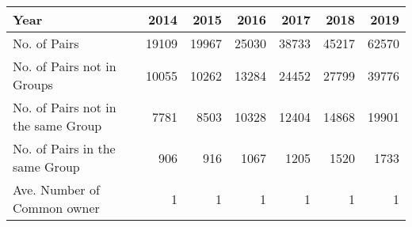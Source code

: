 \begin{tabular}{lrrrrrr}
\toprule
Year &   2014 &   2015 &   2016 &   2017 &   2018 &   2019 \\
\midrule
No. of Pairs                       &  19109 &  19967 &  25030 &  38733 &  45217 &  62570 \\
No. of Pairs not in Groups         &  10055 &  10262 &  13284 &  24452 &  27799 &  39776 \\
No. of Pairs not in the same Group &   7781 &   8503 &  10328 &  12404 &  14868 &  19901 \\
No. of Pairs in the same Group     &    906 &    916 &   1067 &   1205 &   1520 &   1733 \\
Ave. Number of Common owner        &      1 &      1 &      1 &      1 &      1 &      1 \\
\bottomrule
\end{tabular}
